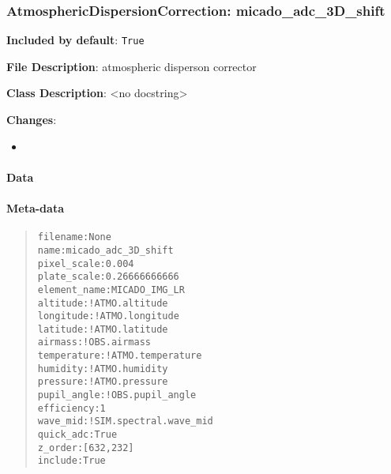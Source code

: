 \subsubsection{AtmosphericDispersionCorrection: \textquotedbl{}micado\_adc\_3D\_shift\textquotedbl{}%
  \label{atmosphericdispersioncorrection-micado-adc-3d-shift}%
}

\textbf{Included by default}: \texttt{True}

\textbf{File Description}: atmospheric disperson corrector

\textbf{Class Description}: <no docstring>

\textbf{Changes}:

\begin{itemize}
\item \end{itemize}


\paragraph{Data%
  \label{id1}%
}


\paragraph{Meta-data%
  \label{id2}%
}

\begin{quote}
\begin{alltt}
    filename : None
        name : micado_adc_3D_shift
 pixel_scale : 0.004
 plate_scale : 0.26666666666
element_name : MICADO_IMG_LR
    altitude : !ATMO.altitude
   longitude : !ATMO.longitude
    latitude : !ATMO.latitude
     airmass : !OBS.airmass
 temperature : !ATMO.temperature
    humidity : !ATMO.humidity
    pressure : !ATMO.pressure
 pupil_angle : !OBS.pupil_angle
  efficiency : 1
    wave_mid : !SIM.spectral.wave_mid
   quick_adc : True
     z_order : [632, 232]
     include : True
\end{alltt}
\end{quote}
